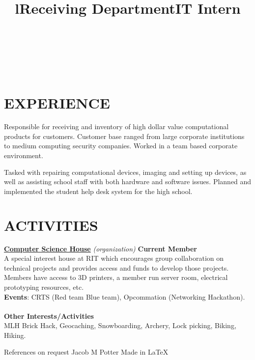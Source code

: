\documentclass[line,margin]{res}
\begin{document}
\begin{resume}
\begin{format}
\title{l}\\
\\
\body\\
\end{format}
\section{EXPERIENCE}
\title{\textbf{Receiving Department}}
\begin{position}
    Responsible for receiving and inventory of high dollar value 
    computational products for customers. Customer base ranged from large 
    corporate institutions to medium computing security companies. Worked in a
    team based corporate environment.
\end{position}
\title{\textbf{IT Intern}}
\begin{position}
    Tasked with repairing computational devices, imaging and setting up devices, 
    as well as assisting school staff with both hardware and software issues. 
    Planned and implemented the student help desk system for the high 
    school.
\end{position}

\section{ACTIVITIES}
\href{https://csh.rit.edu}{\textbf{Computer Science House}}
{\sl (organization)}\hfill
\textbf{Current Member}\\
A special interest house at RIT which encourages group collaboration on technical 
projects and provides access and funds to develop those projects. Members have 
access to 3D printers, a member run server room, electrical prototyping 
resources, etc.\\
\textbf{Events}: 
CRTS (Red team Blue team), Opcommation (Networking Hackathon).\\\\
\textbf{Other Interests/Activities}\\
MLH Brick Hack, Geocaching, Snowboarding, Archery, Lock picking, Biking, Hiking.

\end{resume}
\scriptsize{References on request} \hfill 
\scriptsize{Jacob M Potter} \hfill 
\scriptsize{Made in \LaTeX}
\end{document}
